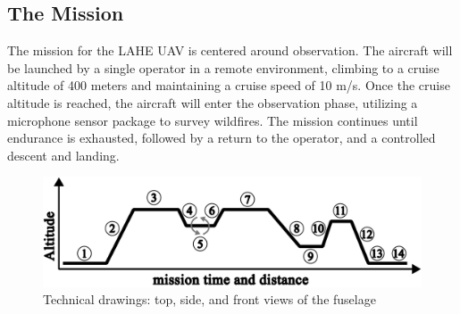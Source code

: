 \documentclass[12pt]{article}
\begin{document}
	\subsection{The Mission}
	The mission for the LAHE UAV is centered around observation. The aircraft will be launched by a single operator in a remote environment, climbing to a cruise altitude of 400 meters and maintaining a cruise speed of 10 m/s. Once the cruise altitude is reached, the aircraft will enter the observation phase, utilizing a microphone sensor package to survey wildfires. The mission continues until endurance is exhausted, followed by a return to the operator, and a controlled descent and landing.
	
	\begin{figure}[h!]
		\centering
		\includegraphics[width=4.5 in]{Media/MissonPlan.png} %
		\caption{Technical drawings: top, side, and front views of the fuselage}
	\end{figure}
		
\end{document}
